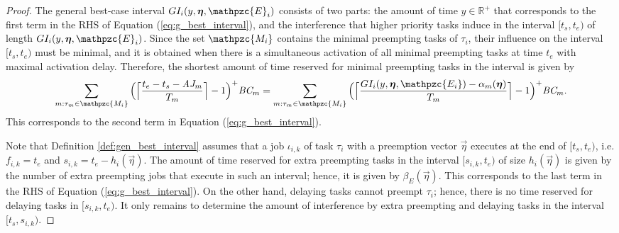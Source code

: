 \begin{proof}
	The general best-case interval $GI_i(y, \vec{\eta},\mathpzc{E}_i)$ consists of two parts: the amount of time $y\in \mathbb{R^+}$ that corresponds to the first term in the RHS of Equation (\ref{eq:g_best_interval}), and the interference that higher priority tasks induce in the interval $ [t_s,t_e) $ of length $GI_i(y, \vec{\eta},\mathpzc{E}_i)$. Since the set $\mathpzc{M_i}$ contains the minimal preempting tasks of $\tau_i$, their influence on the interval $[t_s,t_e)$ must be minimal, and it is obtained when there is a simultaneous activation of all minimal preempting tasks at time $t_e$ with maximal activation delay. Therefore, the shortest amount of time reserved for minimal preempting tasks in the interval is given by 
	\begin{align*}
	\sum\limits_{m:\tau_m \in \mathpzc{M_i}} \Big( \Big\lceil  \dfrac{t_e-t_s-\aj_m}{T_m}\Big\rceil -1 \Big)^+  \bc_m  = 	\sum\limits_{m:\tau_m \in \mathpzc{M_i}} \Big( \Big\lceil  \dfrac{GI_i(y, \vec{\eta},  \mathpzc{E_i})-\alpha_m(\vec{\eta})}{T_m}\Big\rceil -1 \Big)^+  \bc_m.
	\end{align*}
	This corresponds to the second term in Equation (\ref{eq:g_best_interval}).
	
	
	Note that Definition \ref{def:gen_best_interval} assumes that a job $\iota_{i,k}$ of task $\tau_i$ with a preemption vector $\vec{\eta}$ executes at the end of $[t_s,t_e)$, i.e. $f_{i,k}=t_e$ and $s_{i,k} = t_e - h_i(\vec{\eta})$. The amount of time reserved for extra preempting tasks in the interval $[s_{i,k},t_e)$ of size $h_i(\vec{\eta})$ is given by the number of extra preempting jobs that execute in such an interval; hence, it is given by $\beta_E(\vec{\eta})$. This corresponds to the last term in the RHS of Equation (\ref{eq:g_best_interval}). On the other hand, delaying tasks cannot preempt $\tau_i$; hence, there is no time reserved for delaying tasks in $[s_{i,k},t_e)$. It only remains to determine the amount of interference by extra preempting and delaying tasks in the interval $[t_s,s_{i,k})$.
	

\end{proof}
